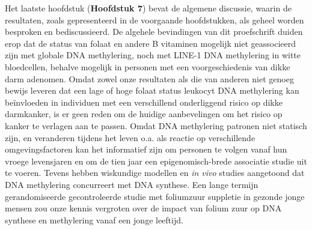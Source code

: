 \noindent Het laatste hoofdstuk (\textbf{Hoofdstuk 7}) bevat de algemene discussie, waarin de resultaten, zoals gepresenteerd in de voorgaande hoofdstukken, als geheel worden besproken en bediscussieerd. De algehele bevindingen van dit proefschrift duiden erop dat de status van folaat en andere B vitaminen mogelijk niet geassocieerd zijn met globale DNA methylering, noch met LINE-1 DNA methylering in witte bloedcellen, behalve mogelijk in personen met een voorgeschiedenis van dikke darm adenomen. Omdat zowel onze resultaten als die van anderen niet genoeg bewijs leveren dat een lage of hoge folaat status leukocyt DNA methylering kan be\"invloeden in individuen met een verschillend onderliggend risico op dikke darmkanker, is er geen reden om de huidige aanbevelingen om het risico op kanker te verlagen aan te passen. Omdat DNA methylering patronen niet statisch zijn, en veranderen tijdens het leven o.a. als reactie op verschillende omgevingsfactoren kan het informatief zijn om personen te volgen vanaf hun vroege levensjaren en om de tien jaar een epigenomisch-brede associatie studie uit te voeren. Tevens hebben wiskundige modellen en \emph{in vivo} studies aangetoond dat DNA methylering concurreert met DNA synthese. Een lange termijn gerandomiseerde gecontroleerde studie met foliumzuur suppletie in gezonde jonge mensen zou onze kennis vergroten over de impact van folium zuur op DNA synthese en methylering vanaf een jonge leeftijd.